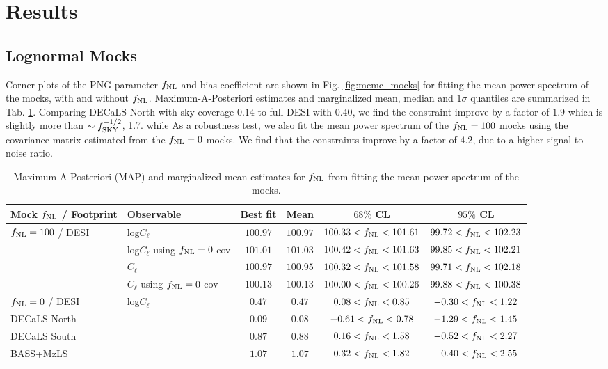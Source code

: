 \section{Results}\label{sec:results}


\subsection{Lognormal Mocks}

Corner plots of the PNG parameter $f_{\rm NL}$ and bias coefficient are shown in Fig. \ref{fig:mcmc_mocks} for fitting the mean power spectrum of the mocks, with and without $f_{\rm NL}$. Maximum-A-Posteriori estimates and marginalized mean, median and $1\sigma$ quantiles are summarized in Tab. \ref{tab:mocksmcmc}. Comparing DECaLS North with sky coverage $0.14$ to full DESI with $0.40$, we find the constraint improve by a factor of $1.9$ which is slightly more than $\sim f_{\rm SKY}^{-1/2}$, 1.7. while As a robustness test, we also fit the mean power spectrum of the $f_{\rm NL}=100$ mocks using the covariance matrix estimated from the $f_{\rm NL}=0$ mocks. We find that the constraints improve by a factor of $4.2$, due to a higher signal to noise ratio.

\begin{table}
  \begin{center}
    \caption{Maximum-A-Posteriori (MAP) and marginalized mean estimates for $f_{\rm NL}$ from fitting the mean power spectrum of the mocks.}
    \label{tab:mocksmcmc}
    \begin{tabular}{llcccc}
    \hline
    \hline
Mock $f_{\rm NL}$ /  Footprint   &  Observable & 	Best fit  & Mean & $ 68\%$ CL & $ 95\%$ CL \\
    \hline
$f_{\rm NL}=100$ / DESI &log$C_{\ell}$                           & $100.97$& $100.97$& $100.33<f_{\rm NL}<101.61$& $ 99.72<f_{\rm NL}<102.23$\\
&log$C_{\ell}$ using $f_{\rm NL}=0$ cov  & $101.01$& $101.03$& $100.42<f_{\rm NL}<101.63$& $ 99.85<f_{\rm NL}<102.21$\\
&$C_{\ell}$                              & $100.97$& $100.95$& $100.32<f_{\rm NL}<101.58$& $ 99.71<f_{\rm NL}<102.18$\\
&$C_{\ell}$ using $f_{\rm NL}=0$ cov     & $100.13$& $100.13$& $100.00<f_{\rm NL}<100.26$& $ 99.88<f_{\rm NL}<100.38$\\
\hline
$f_{\rm NL}=0$ / DESI  & log$C_{\ell}$   & $  0.47$& $  0.47$& $  0.08<f_{\rm NL}<  0.85$& $ -0.30<f_{\rm NL}<  1.22$\\
 DECaLS North       &                 & $  0.09$& $  0.08$& $ -0.61<f_{\rm NL}<  0.78$& $ -1.29<f_{\rm NL}<  1.45$\\
 DECaLS South      &                  & $  0.87$& $  0.88$& $  0.16<f_{\rm NL}<  1.58$& $ -0.52<f_{\rm NL}<  2.27$\\
 BASS+MzLS           &               & $  1.07$& $  1.07$& $  0.32<f_{\rm NL}<  1.82$& $ -0.40<f_{\rm NL}<  2.55$\\
    \end{tabular}
  \end{center}
\end{table}


